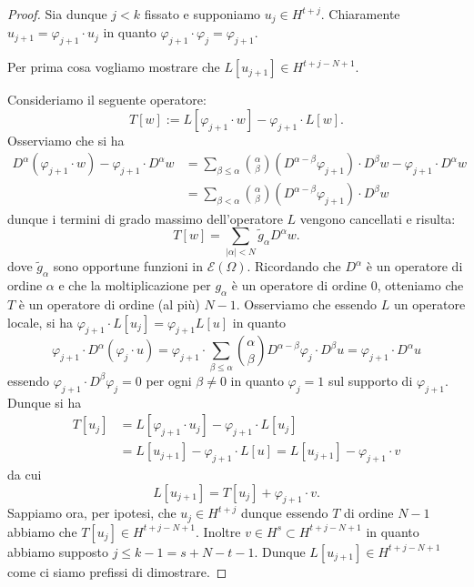 \documentclass[italian,a4paper,oneside,headinclude]{scrbook}
\renewcommand{\phi}{\varphi}
\newcommand{\E}{\mathcal E}
\newcommand{\abs}[1]{{\left|#1\right|}}
\newcommand{\defeq}{:=}
\begin{document}
\begin{proof}
    Sia dunque $j<k$ fissato e supponiamo
    $u_j \in H^{t+j}$.
    Chiaramente $u_{j+1} = \phi_{j+1}\cdot u_j$ in quanto
    $\phi_{j+1} \cdot \phi_j = \phi_{j+1}$.

    Per prima cosa vogliamo mostrare che
    $L[u_{j+1}]\in H^{t+j-N+1}$.

    Consideriamo il seguente operatore:
    \[
    T[w] \defeq L[\phi_{j+1} \cdot w] - \phi_{j+1} \cdot L [w].
    \]
    Osserviamo che si ha
    \begin{align*}
    D^\alpha (\phi_{j+1} \cdot w) - \phi_{j+1} \cdot D^\alpha w
    &=  \sum_{\beta \le \alpha} {\alpha \choose \beta}
    (D^{\alpha-\beta} \phi_{j+1}) \cdot D^{\beta} w - \phi_{j+1}\cdot D^\alpha w\\
    &= \sum_{\beta < \alpha} {\alpha \choose \beta} (D^{\alpha-\beta}
    \phi_{j+1}) \cdot D^\beta w
    \end{align*}
    dunque i termini di grado massimo dell'operatore $L$ vengono
    cancellati e risulta:
    \[
    T[w] = \sum_{\abs{\alpha}< N} \tilde g_\alpha D^\alpha w.
    \]
    dove $\tilde g_\alpha$ sono opportune funzioni in $\E(\Omega)$.
    Ricordando che $D^\alpha$ è un operatore di ordine $\alpha$ e che
    la moltiplicazione per $g_\alpha$ è un operatore di ordine $0$,
    otteniamo che $T$ è un operatore di ordine (al più) $N-1$.
    Osserviamo che essendo $L$ un operatore locale, si ha $\phi_{j+1}
    \cdot L [u_j] = \phi_{j+1} L [u]$ in quanto
    \[
    \phi_{j+1}\cdot D^\alpha(\phi_j \cdot u) = \phi_{j+1} \cdot \sum_{\beta\le \alpha} {\alpha
      \choose \beta} D^{\alpha-\beta} \phi_j \cdot D^\beta u
    = \phi_{j+1} \cdot D^\alpha u
    \]
    essendo $\phi_{j+1}\cdot D^\beta \phi_j=0$ per ogni $\beta \neq 0$
    in quanto $\phi_j=1$ sul supporto di $\phi_{j+1}$.
    Dunque si ha
    \begin{align*}
      T[u_j]
      &= L[\phi_{j+1} \cdot u_j] - \phi_{j+1} \cdot L[u_j] \\
      &= L[u_{j+1}] - \phi_{j+1} \cdot L[u]
      = L[u_{j+1}] - \phi_{j+1} \cdot v
    \end{align*}
    da cui
    \[
    L[u_{j+1}] = T[u_j] + \phi_{j+1} \cdot v.
    \]
    Sappiamo ora, per ipotesi, che $u_j \in H^{t+j}$
    dunque essendo $T$ di ordine $N-1$ abbiamo che
    $T[u_j] \in H^{t+j-N+1}$.
    Inoltre $v\in H^s \subset H^{t+j-N+1}$ in quanto abbiamo supposto
    $j\le k-1 = s+N-t-1$. Dunque $L[u_{j+1}] \in H^{t+j-N+1}$ come ci
    siamo prefissi di dimostrare.


\end{proof}
\end{document}
